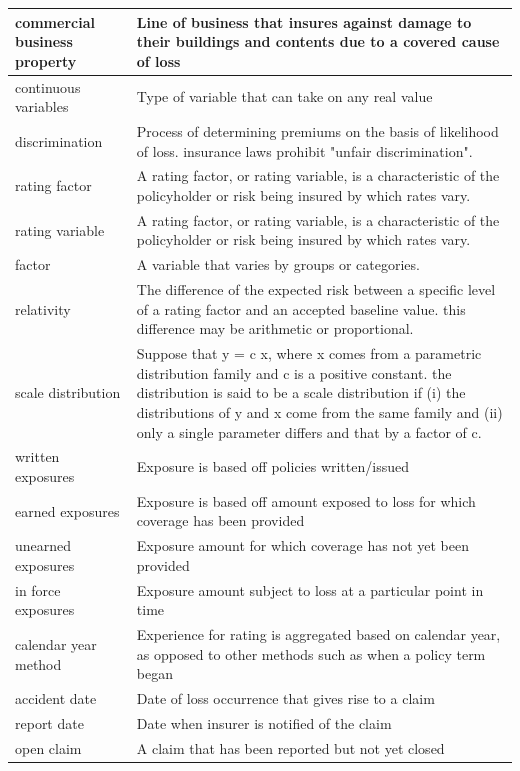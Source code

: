 \documentclass[
]{book}
\begin{document}
\begin{longtable}{>{\raggedright\arraybackslash}p{10em}|>{\raggedright\arraybackslash}p{30em}}
\hline
commercial business property & Line of business that insures against damage to their buildings and contents due to a covered cause of loss\\
\hline
continuous variables & Type of variable that can take on any real value\\
\hline
discrimination & Process of determining premiums on the basis of likelihood of loss. insurance laws prohibit "unfair discrimination".\\
\hline
rating factor & A rating factor, or rating variable, is a characteristic of the policyholder or risk being insured by which rates vary.\\
\hline
rating variable & A rating factor, or rating variable, is a characteristic of the policyholder or risk being insured by which rates vary.\\
\hline
factor & A variable that varies by groups or categories.\\
\hline
relativity & The difference of the expected risk between a specific level of a rating factor and an accepted baseline value. this difference may be arithmetic or proportional.\\
\hline
scale distribution & Suppose that y = c x, where x comes from a parametric distribution family and c is a positive constant. the distribution is said to be a scale distribution if (i) the distributions of y and x come from the same family and (ii) only a single parameter differs and that by a factor of c.\\
\hline
written exposures & Exposure is based off policies written/issued\\
\hline
earned exposures & Exposure is based off amount exposed to loss for which coverage has been provided\\
\hline
unearned exposures & Exposure amount for which coverage has not yet been provided\\
\hline
in force exposures & Exposure amount subject to loss at a particular point in time\\
\hline
calendar year method & Experience for rating is aggregated based on calendar year, as opposed to other methods such as when a policy term began\\
\hline
accident date & Date of loss occurrence that gives rise to a claim\\
\hline
report date & Date when insurer is notified of the claim\\
\hline
open claim & A claim that has been reported but not yet closed\\

\end{longtable}
\end{document}
